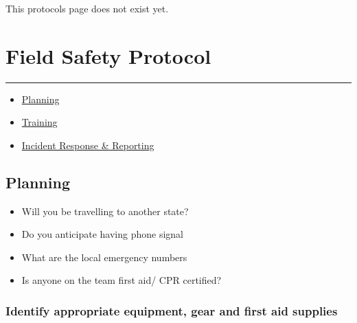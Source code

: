 \documentclass[
  letterpaper,
  DIV=11,
  numbers=noendperiod]{scrreprt}
\begin{document}
This protocols page does not exist yet.

\hypertarget{field-safety-protocol}{%
\chapter{Field Safety Protocol}\label{field-safety-protocol}}

\begin{center}\rule{0.5\linewidth}{0.5pt}\end{center}

\begin{itemize}
\item
  \href{https://drk-lo.github.io/lotterhoslabprotocols/field_fieldsafety_protocol/\#planning}{Planning}
\item
  \href{https://drk-lo.github.io/lotterhoslabprotocols/field_fieldsafety_protocol/\#training}{Training}
\item
  \href{https://drk-lo.github.io/lotterhoslabprotocols/field_fieldsafety_protocol/\#emergency-procedures}{Incident
  Response \& Reporting}
\end{itemize}

\hypertarget{planning}{%
\section*{\texorpdfstring{\textbf{Planning}}{Planning}}\label{planning}}

\begin{itemize}
\item
  Will you be travelling to another state?
\item
  Do you anticipate having phone signal
\item
  What are the local emergency numbers
\item
  Is anyone on the team first aid/ CPR certified?
\end{itemize}

\hypertarget{identify-appropriate-equipment-gear-and-first-aid-supplies}{%
\subsection*{\texorpdfstring{\textbf{Identify appropriate equipment,
gear and first aid
supplies}}{Identify appropriate equipment, gear and first aid supplies}}\label{identify-appropriate-equipment-gear-and-first-aid-supplies}}
\end{document}
